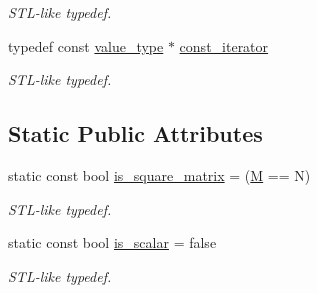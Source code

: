 \begin{DoxyCompactItemize}
\begin{DoxyCompactList}\small\item\em S\-T\-L-\/like typedef. \end{DoxyCompactList}\item 
\hypertarget{struct_d_o_1_1_element_traits_3_01_matrix_3_01_t_00_01_m_00_01_n_01_4_01_4_aad40b6f664e3f2f7ab960886c2f7e325}{typedef const \hyperlink{struct_d_o_1_1_element_traits_3_01_matrix_3_01_t_00_01_m_00_01_n_01_4_01_4_a1aa367efebeaa912dd4621408cde4541}{value\-\_\-type} $\ast$ \hyperlink{struct_d_o_1_1_element_traits_3_01_matrix_3_01_t_00_01_m_00_01_n_01_4_01_4_aad40b6f664e3f2f7ab960886c2f7e325}{const\-\_\-iterator}}\label{struct_d_o_1_1_element_traits_3_01_matrix_3_01_t_00_01_m_00_01_n_01_4_01_4_aad40b6f664e3f2f7ab960886c2f7e325}

\begin{DoxyCompactList}\small\item\em S\-T\-L-\/like typedef. \end{DoxyCompactList}\end{DoxyCompactItemize}
\subsection*{Static Public Attributes}
\begin{DoxyCompactItemize}
\item 
\hypertarget{struct_d_o_1_1_element_traits_3_01_matrix_3_01_t_00_01_m_00_01_n_01_4_01_4_a2c1a2bceddef2c534fed633fdc679c17}{static const bool \hyperlink{struct_d_o_1_1_element_traits_3_01_matrix_3_01_t_00_01_m_00_01_n_01_4_01_4_a2c1a2bceddef2c534fed633fdc679c17}{is\-\_\-square\-\_\-matrix} = (\hyperlink{struct_d_o_1_1_m}{M} == N)}\label{struct_d_o_1_1_element_traits_3_01_matrix_3_01_t_00_01_m_00_01_n_01_4_01_4_a2c1a2bceddef2c534fed633fdc679c17}

\begin{DoxyCompactList}\small\item\em S\-T\-L-\/like typedef. \end{DoxyCompactList}\item 
\hypertarget{struct_d_o_1_1_element_traits_3_01_matrix_3_01_t_00_01_m_00_01_n_01_4_01_4_a083611162fed7f6427026ec1d5cd6678}{static const bool \hyperlink{struct_d_o_1_1_element_traits_3_01_matrix_3_01_t_00_01_m_00_01_n_01_4_01_4_a083611162fed7f6427026ec1d5cd6678}{is\-\_\-scalar} = false}\label{struct_d_o_1_1_element_traits_3_01_matrix_3_01_t_00_01_m_00_01_n_01_4_01_4_a083611162fed7f6427026ec1d5cd6678}

\begin{DoxyCompactList}\small\item\em S\-T\-L-\/like typedef. \end{DoxyCompactList}\end{DoxyCompactItemize}


